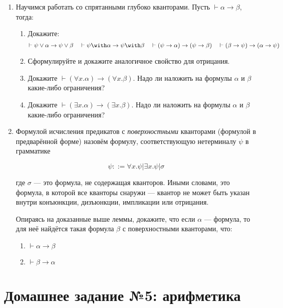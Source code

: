 \documentclass[10pt,a4paper,oneside]{article}
\begin{document}
\begin{enumerate}
\item Научимся работать со спрятанными глубоко кванторами. Пусть $\vdash\alpha\rightarrow\beta$, тогда:
\begin{enumerate}
\item Докажите: $$\vdash\psi\vee\alpha \rightarrow \psi\vee\beta\quad\vdash\psi\with\alpha \rightarrow \psi\with\beta\quad
\vdash(\psi\rightarrow\alpha) \rightarrow (\psi\rightarrow\beta)\quad\vdash(\beta\rightarrow\psi) \rightarrow (\alpha\rightarrow\psi)$$
\item Сформулируйте и докажите аналогичное свойство для отрицания.
\item Докажите $\vdash(\forall x.\alpha)\rightarrow(\forall x.\beta)$. 
Надо ли наложить на формулы $\alpha$ и $\beta$ какие-либо ограничения?
\item Докажите $\vdash(\exists x.\alpha)\rightarrow(\exists x.\beta)$. 
Надо ли наложить на формулы $\alpha$ и $\beta$ какие-либо ограничения?
\end{enumerate}

\item Формулой исчисления предикатов с \emph{поверхностными} кванторами (формулой в предварённой форме) назовём формулу,
соответствующую нетерминалу $\psi$ в грамматике

$$\psi ::= \forall x.\psi | \exists x.\psi | \sigma$$

где $\sigma$ --- это формула, не содержащая кванторов. Иными словами, это формула, в которой все кванторы снаружи ---
квантор не может быть указан внутри конъюнкции, дизъюнкции, импликации или отрицания.

Опираясь на доказанные выше леммы, докажите, что
если $\alpha$ --- формула, то для неё найдётся такая формула $\beta$ с поверхностными кванторами, что:
\begin{enumerate}
\item $\vdash\alpha\rightarrow\beta$
\item $\vdash\beta\rightarrow\alpha$
\end{enumerate}


\end{enumerate}

\section*{Домашнее задание №5: арифметика}
\end{document}
